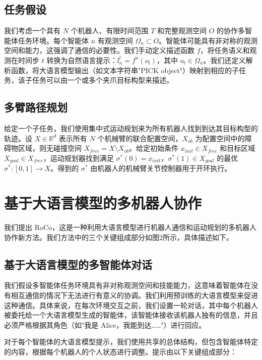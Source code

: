 \documentclass[UTF8, a4paper, 12pt]{article}
\begin{document}
\subsection{任务假设}

我们考虑一个具有 $N$ 个机器人、有限时间范围 $T$ 和完整观测空间 $O$ 的协作多智能体任务环境。每个智能体 $n$ 有观测空间 $\Omega_n \subset O$。智能体可能具有非对称的观测空间和能力，这强调了通信的必要性。我们手动定义描述函数 $f$，将任务语义和观测在时间步 $t$ 转换为自然语言提示：$l_n^t = f^n(o_t)$，其中 $o_t \in \Omega_n$。我们还定义解析函数，将大语言模型输出（如文本字符串"PICK object"）映射到相应的子任务，该子任务可以由一个或多个夹爪目标构型来描述。

\subsection{多臂路径规划}

给定一个子任务，我们使用集中式运动规划来为所有机器人找到到达其目标构型的轨迹。设 $X \in \mathbb{R}^d$ 表示所有 $N$ 个机械臂的联合配置空间，$X_{ob}$ 为配置空间中的障碍物区域，则无碰撞空间 $X_{free} = X \setminus X_{ob}$。给定初始条件 $x_{init} \in X_{free}$ 和目标区域 $X_{goal} \in X_{free}$，运动规划器找到满足 $\sigma^*(0) = x_{init}$，$\sigma^*(1) \in X_{goal}$ 的最优 $\sigma^* : [0, 1] \rightarrow X$。得到的 $\sigma^*$ 由机器人的机械臂关节控制器用于开环执行。

\section{基于大语言模型的多机器人协作}

我们提出 RoCo，这是一种利用大语言模型进行机器人通信和运动规划的多机器人协作新方法。我们方法中的三个关键组成部分如图2所示，具体描述如下。

\subsection{基于大语言模型的多智能体对话}

我们假设多智能体任务环境具有非对称观测空间和技能能力，这意味着智能体在没有相互通信的情况下无法进行有意义的协调。我们利用预训练的大语言模型来促进这种通信。具体来说，在每次环境交互之前，我们设置一轮对话，其中每个机器人被委托给一个大语言模型生成的智能体，该智能体接收该机器人独有的信息，并且必须严格根据其角色（如"我是 Alice，我能到达……"）进行回应。

对于每个智能体的大语言模型提示，我们使用共享的总体结构，但包含智能体特定的内容，根据每个机器人的个人状态进行调整。提示由以下关键组成部分：
\end{document}
